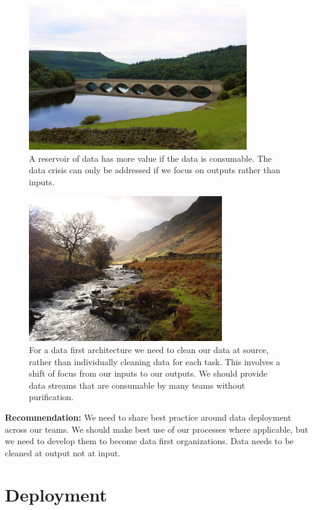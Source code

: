 \documentclass[a4paper]{caesar_book}
\begin{document}
\begin{figure}[htbp]%
	\includegraphics[height=180pt,width=\textwidth]{pictures/water-bridge-hill-transport-arch.jpg}%
	\caption*{A reservoir of data has more value if the data is consumable. The data crisis can only be addressed if we focus on outputs rather than inputs.}%
	\label{water-bridge}%
\end{figure}%

\begin{figure}[htbp]%
	\includegraphics[height=180pt,width=\textwidth]{pictures/Lake_District.JPG}%
	\caption*{For a data first architecture we need to clean our data at source, rather than individually cleaning data for each task. This involves a shift of focus from our inputs to our outputs. We should provide data streams that are consumable by many teams without purification.}%
	\label{lake-district}%
\end{figure}%

\textbf{Recommendation:} We need to share best practice around data deployment across our teams. We should make best use of our processes where applicable, but we need to develop them to become data first organizations. Data needs to be cleaned at output not at input.

\section{Deployment}
\end{document}
